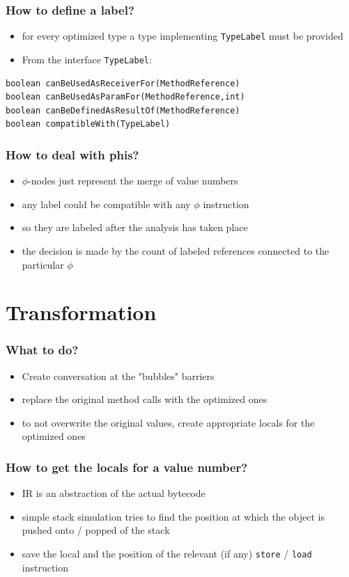 \documentclass{beamer}
\begin{document}
\begin{frame}[fragile]
  \frametitle{How to define a label?}
  \begin{itemize}
     \item for every optimized type a type implementing \texttt{TypeLabel} must be provided
     \item From the interface \texttt{TypeLabel}:
  \end{itemize}

  \begin{lstlisting}
boolean canBeUsedAsReceiverFor(MethodReference)
boolean canBeUsedAsParamFor(MethodReference,int)
boolean canBeDefinedAsResultOf(MethodReference)
boolean compatibleWith(TypeLabel)
  \end{lstlisting}
\end{frame}

\begin{frame}
  \frametitle{How to deal with phis?}
  \begin{itemize}
    \item $\phi$-nodes just represent the merge of value numbers  
    \item any label could be compatible with any $\phi$ instruction
    \item so they are labeled after the analysis has taken place
    \item the decision is made by the count of labeled references connected to the particular $\phi$
  \end{itemize}
\end{frame}

\section{Transformation}

\frame{\sectionpage}

\begin{frame}
	\frametitle{What to do?}
	\begin{itemize}
    \item Create conversation at the "bubbles" barriers
    \item replace the original method calls with the optimized ones
    \item to not overwrite the original values, create appropriate locals for the optimized ones
	\end{itemize}
\end{frame}

\begin{frame}
	\frametitle{How to get the locals for a value number?}
	\begin{itemize}
    \item IR is an abstraction of the actual bytecode
    \item simple stack simulation tries to find the position at which the object is pushed onto / popped of the stack
    \item save the local and the position of the relevant (if any) \texttt{store} / \texttt{load} instruction 
	\end{itemize}
\end{frame}
\end{document}
